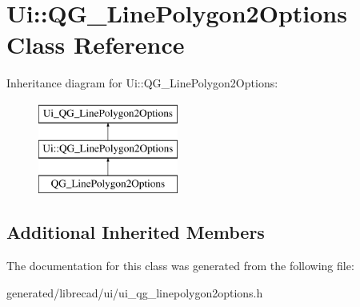 \hypertarget{classUi_1_1QG__LinePolygon2Options}{\section{Ui\-:\-:Q\-G\-\_\-\-Line\-Polygon2\-Options Class Reference}
\label{classUi_1_1QG__LinePolygon2Options}
}
Inheritance diagram for Ui\-:\-:Q\-G\-\_\-\-Line\-Polygon2\-Options\-:\begin{figure}[H]
\begin{center}
\leavevmode
\includegraphics[height=3.000000cm]{classUi_1_1QG__LinePolygon2Options}
\end{center}
\end{figure}
\subsection*{Additional Inherited Members}


The documentation for this class was generated from the following file\-:\begin{DoxyCompactItemize}
\item 
generated/librecad/ui/ui\-\_\-qg\-\_\-linepolygon2options.\-h\end{DoxyCompactItemize}
